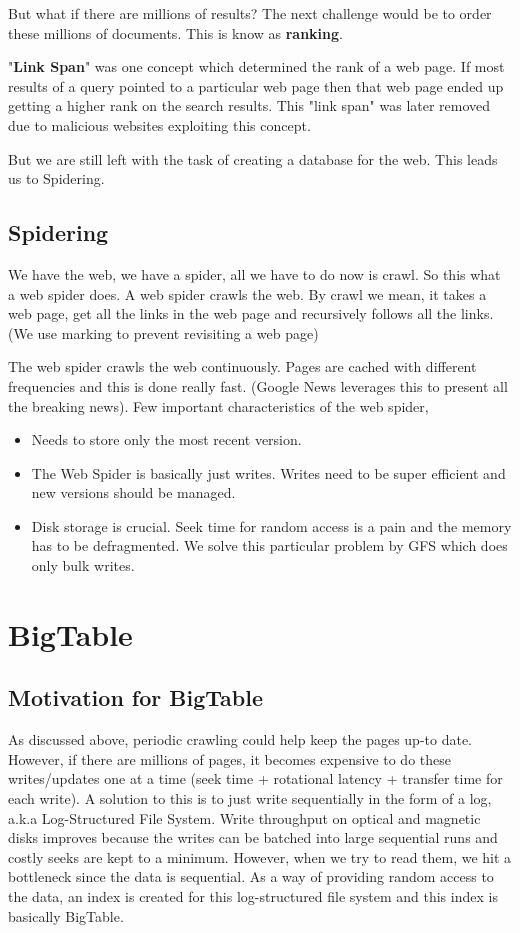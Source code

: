 \documentclass[twoside]{article}
\begin{document}
But what if there are millions of results? The next challenge would be to order these millions of documents. This is know as \textbf{ranking}.

"\textbf{Link Span}" was one concept which determined the rank of a web page. If most results of a query pointed to a particular web page then that web page ended up getting a higher rank on the search results. This "link span" was later removed due to malicious websites exploiting this concept.

But we are still left with the task of creating a database for the web. This leads us to Spidering.

\subsection{Spidering}
We have the web, we have a spider, all we have to do now is crawl. So this what a web spider does. A web spider crawls the web. By crawl we mean, it takes a web page, get all the links in the web page and recursively follows all the links. (We use marking to prevent revisiting a web page)

The web spider crawls the web continuously. Pages are cached with different frequencies and this is done really fast. (Google News leverages this to present all the breaking news). Few important characteristics of the web spider,

\begin{itemize}
\item Needs to store only the most recent version.
\item The Web Spider is basically just writes. Writes need to be super efficient and new versions should be managed.
\item Disk storage is crucial. Seek time for random access is a pain and the memory has to be defragmented. We solve this particular problem by GFS which does only bulk writes.
\end{itemize}

\section{BigTable}
\subsection{Motivation for BigTable}
As discussed above, periodic crawling could help keep the pages up-to date. However, if there are millions of pages, it becomes expensive to do these writes/updates one at a time (seek time + rotational latency + transfer time for each write). A solution to this is to just write sequentially in the form of a log, a.k.a Log-Structured File System. Write throughput on optical and magnetic disks improves because the writes can be batched into large sequential runs and costly seeks are kept to a minimum. However, when we try to read them, we hit a bottleneck since the data is sequential. As a way of providing random access to the data, an index is created for this log-structured file system and this index is basically BigTable.
\end{document}
